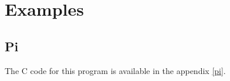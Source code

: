 \chapter{Examples}

\section{Pi}

The C code for this program is available in the appendix \ref{pi}. 

